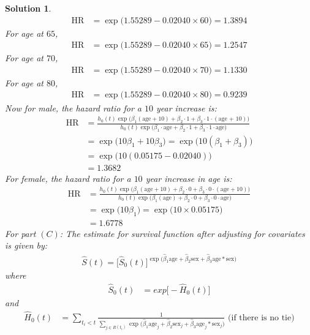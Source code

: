 \documentclass[11pt]{article}
\newtheorem{sol}{Solution}
\begin{document}
\begin{sol}
\begin{align*}
		\text{HR} &= \exp\Big(1.55289 -0.02040\times 60\Big) = 1.3894
	\end{align*}
	For age at $65$, 
	\begin{align*}
		\text{HR} &= \exp\Big(1.55289 -0.02040\times 65\Big) = 1.2547
	\end{align*}
	For age at $70$,
	\begin{align*}
		\text{HR} &= \exp\Big(1.55289 -0.02040\times 70\Big) = 1.1330
	\end{align*}
	For age at $80$,
	\begin{align*}
		\text{HR} &= \exp\Big(1.55289 -0.02040\times 80\Big) = 0.9239
	\end{align*}
	Now for male, the hazard ratio for a $10$ year increase is:
	\begin{align*}
		\text{HR} &= \frac{h_0(t)\exp\Big(\beta_1(\text{age} + 10) + \beta_2\cdot 1 + \beta_3\cdot 1 \cdot (\text{age + 10})\Big)}{h_0(t)\exp\Big(\beta_1\cdot \text{age} + \beta_2\cdot 1 + \beta_3\cdot 1\cdot \text{age}\Big)}\\
		&= \exp\Big(10\beta_1 + 10\beta_3\Big) = \exp\Big(10(\beta_1 + \beta_3)\Big)\\
		&= \exp\Big(10(0.05175-0.02040)\Big)\\
		&= 1.3682
	\end{align*}
	For female, the hazard ratio for a $10$ year increase in age is:
	\begin{align*}
		\text{HR} &= \frac{h_0(t)\exp\Big(\beta_1(\text{age} + 10) + \beta_2\cdot 0 + \beta_3\cdot 0 \cdot (\text{age} + 10)\Big)}{h_0(t)\exp\Big(\beta_1(\text{age}) + \beta_2\cdot 0 + \beta_3\cdot 0 \cdot \text{age}\Big)}\\
		&= \exp\Big(10\beta_1\Big) = \exp\Big(10\times 0.05175\Big)\\
		&= 1.6778
	\end{align*}
	\vskip 2mm
	For part $(C)$:\vskip 2mm
	The estimate for survival function after adjusting for covariates is given by:
	\begin{align*}
		\hat{S}(t) = \Big[\hat{S}_0(t)\Big]^{\exp\Big(\hat{\beta}_1\text{age} + \hat{\beta}_2\text{sex} + \hat{\beta}_3\text{age}*\text{sex}\Big)}
	\end{align*}
	where
	\begin{align*}
		\hat{S}_0(t) &= exp\Big[-\hat{H}_0(t)\Big]
	\end{align*}
	and
	\begin{align*}
		\hat{H}_0(t) &= \sum_{t_i < t}\frac{1}{\sum_{j \in R(t_i)}\exp\Big(\hat{\beta}_1\text{age}_j + \hat{\beta}_2\text{sex}_j + \hat{\beta}_3\text{age}_j*\text{sex}_j\Big)} \text{ (if there is no tie)}\\

\end{align*}
\end{sol}
\end{document}
